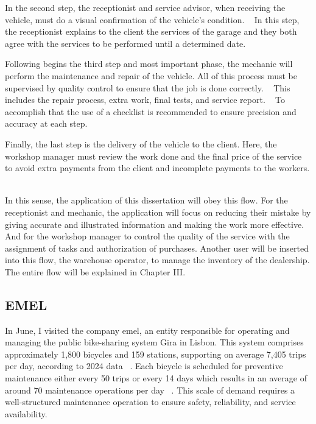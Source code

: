In the second step, the receptionist and service advisor, when receiving the vehicle, must do a visual confirmation of the vehicle's condition. ~\cite{Setting_the_after_sale_process}
In this step, the receptionist explains to the client the services of the garage and they both agree with the services to be performed until a determined date. ~\cite{Setting_the_after_sale_process}

Following begins the third step and most important phase, the mechanic will perform the maintenance and repair of the vehicle. 
All of this process must be supervised by quality control to ensure that the job is done correctly. ~\cite{Setting_the_after_sale_process}
This includes the repair process, extra work, final tests, and service report. ~\cite{Setting_the_after_sale_process}
To accomplish that the use of a checklist is recommended to ensure precision and accuracy at each step. ~\cite{Setting_the_after_sale_process}

Finally, the last step is the delivery of the vehicle to the client. 
Here, the workshop manager must review the work done and the final price of the service to avoid extra payments from the client and incomplete payments to the workers. ~\cite{Setting_the_after_sale_process}

In this sense, the application of this dissertation will obey this flow.
For the receptionist and mechanic, the application will focus on reducing their mistake by giving accurate and illustrated information and making the work more effective.
And for the workshop manager to control the quality of the service with the assignment of tasks and authorization of purchases. 
Another user will be inserted into this flow, the warehouse operator, to manage the inventory of the dealership. 
The entire flow will be explained in Chapter III. 


\subsection{EMEL}


In June, I visited the company \ac{emel}, an entity responsible for operating and managing the public bike-sharing system Gira in Lisbon. This system comprises approximately 1,800 bicycles and 159 stations, supporting on average 7,405 trips per day, according to 2024 data ~\cite{Gira_Trips}. Each bicycle is scheduled for preventive maintenance either every 50 trips or every 14 days which results in an average of around 70 maintenance operations per day ~\cite{Gira_Maintenance}. This scale of demand requires a well-structured maintenance operation to ensure safety, reliability, and service availability.

